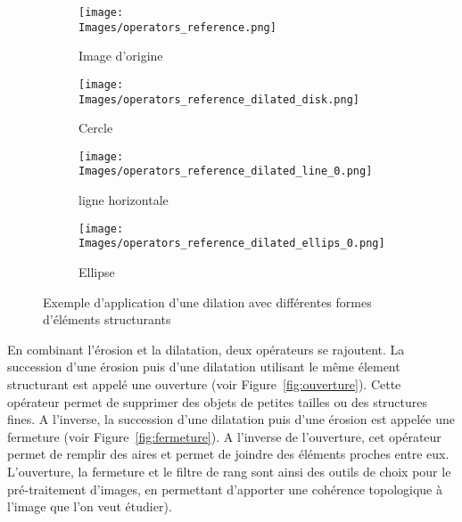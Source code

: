 \documentclass[\main/main.tex]{subfiles}
\begin{document}
\begin{figure}[h]
    \centering
    \begin{subfigure}[b]{0.45\textwidth}
       \caption{
       Image d'origine
            }
       \centering \texttt{[image: \\Images/operators\_reference.png]}
    \end{subfigure}
    \begin{subfigure}[b]{0.45\textwidth}
       \caption{
       Cercle
            }
       \centering \texttt{[image: \\Images/operators\_reference\_dilated\_disk.png]}
    \end{subfigure}
    \begin{subfigure}[b]{0.45\textwidth}
       \caption{
       ligne horizontale
            }
       \centering \texttt{[image: \\Images/operators\_reference\_dilated\_line\_0.png]}
    \end{subfigure}
    \begin{subfigure}[b]{0.45\textwidth}
       \caption{
       Ellipse
            }
       \centering \texttt{[image: \\Images/operators\_reference\_dilated\_ellips\_0.png]}
    \end{subfigure}
    \caption{
        \label{fig:morpho:operateurs}
        Exemple d'application d'une dilation avec différentes formes d'éléments structurants
    }
    
\end{figure}
%
%
En combinant l'érosion et la dilatation, deux opérateurs se rajoutent.
%
La succession d'une érosion puis d'une dilatation utilisant le même élement structurant
est appelé une ouverture
(voir Figure~\ref{fig:ouverture}).
%
Cette opérateur permet de supprimer des objets de petites tailles ou des structures fines.
%
A l'inverse, la succession d'une dilatation puis d'une érosion est appelée une fermeture
(voir Figure~\ref{fig:fermeture}).
%
A l'inverse de l'ouverture, cet opérateur permet de remplir des aires et permet de joindre des éléments proches entre eux.
%
L'ouverture, la fermeture et le filtre de rang sont ainsi des outils de choix pour le pré\hyp{}traitement d'images, en permettant d'apporter une cohérence topologique à l'image que l'on veut étudier).
\end{document}
